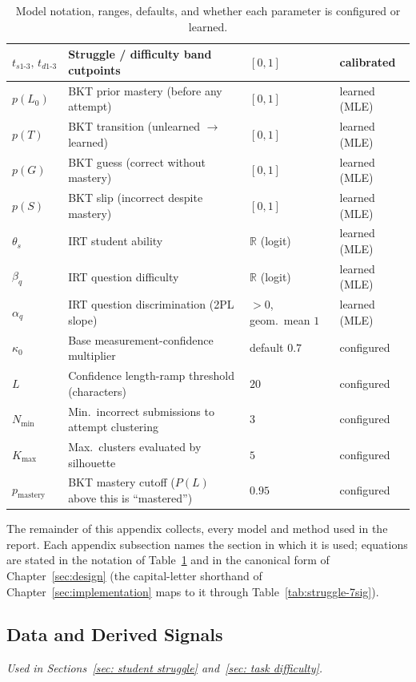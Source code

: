 \begin{table}[H]
\begin{tabular}{|l|p{}|l|l|}
    $t_{s1\text{-}3},\, t_{d1\text{-}3}$ & Struggle / difficulty band cutpoints & $[0,1]$ & calibrated \\
    \hline
    $p(L_0)$ & BKT prior mastery (before any attempt) & $[0,1]$ & learned (MLE) \\
    \hline
    $p(T)$   & BKT transition (unlearned $\to$ learned) & $[0,1]$ & learned (MLE) \\
    \hline
    $p(G)$   & BKT guess (correct without mastery) & $[0,1]$ & learned (MLE) \\
    \hline
    $p(S)$   & BKT slip (incorrect despite mastery) & $[0,1]$ & learned (MLE) \\
    \hline
    $\theta_s$ & IRT student ability & $\mathbb{R}$ (logit) & learned (MLE) \\
    \hline
    $\beta_q$  & IRT question difficulty & $\mathbb{R}$ (logit) & learned (MLE) \\
    \hline
    $\alpha_q$ & IRT question discrimination (2PL slope) & $>0$, geom.\ mean $1$ & learned (MLE) \\
    \hline
    $\kappa_0$ & Base measurement-confidence multiplier & default $0.7$ & configured \\
    \hline
    $L$ & Confidence length-ramp threshold (characters) & $20$ & configured \\
    \hline
    $N_{\min}$ & Min.\ incorrect submissions to attempt clustering & $3$ & configured \\
    \hline
    $K_{\max}$ & Max.\ clusters evaluated by silhouette & $5$ & configured \\
    \hline
    $p_{\mathrm{mastery}}$ & BKT mastery cutoff ($P(L)$ above this is ``mastered'') & $0.95$ & configured \\
    \hline
    \end{tabular}
    \caption{Model notation, ranges, defaults, and whether each parameter is configured or learned.}
    \label{tab:notation}
\end{table}

The remainder of this appendix collects, every model and method used in the report.
Each appendix subsection names the section in which it is used; equations are stated in the notation of
Table~\ref{tab:notation} and in the canonical form of Chapter~\ref{sec:design} (the capital-letter
shorthand of Chapter~\ref{sec:implementation} maps to it through Table~\ref{tab:struggle-7sig}).

\subsection{Data and Derived Signals}
\emph{Used in Sections~\ref{sec: student struggle} and~\ref{sec: task difficulty}.}

